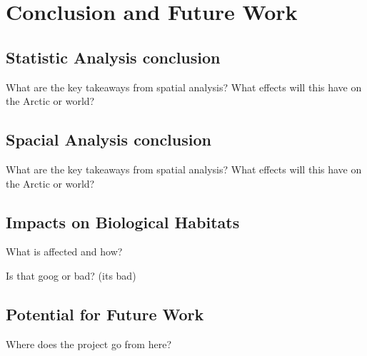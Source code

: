 
\chapter{Conclusion and Future Work}

\section{Statistic Analysis conclusion}

What are the key takeaways from spatial analysis?
What effects will this have on the Arctic or world?

\section{Spacial Analysis conclusion}

What are the key takeaways from spatial analysis?
What effects will this have on the Arctic or world?

\section{Impacts on Biological Habitats}


What is affected and how?

Is that goog or bad? (its bad)
\section{Potential for Future Work}


Where does the project go from here?